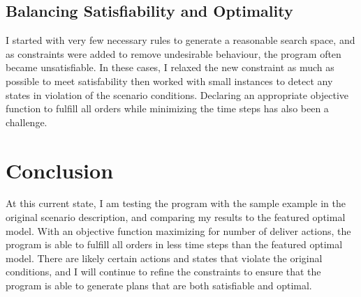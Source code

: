 \documentclass[letterpaper]{article}
\begin{document}
\subsection{Balancing Satisfiability and Optimality}

I started with very few necessary rules to generate a reasonable search space, and as constraints were added to remove undesirable behaviour, the program often became unsatisfiable. In these cases, I relaxed the new constraint as much as possible to meet satisfability then worked with small instances to detect any states in violation of the scenario conditions. Declaring an appropriate objective function to fulfill all orders while minimizing the time steps has also been a challenge.

\section{Conclusion}

At this current state, I am testing the program with the sample example in the original scenario description, and comparing my results to the featured optimal model. With an objective function maximizing for number of deliver actions, the program is able to fulfill all orders in less time steps than the featured optimal model. There are likely certain actions and states that violate the original conditions, and I will continue to refine the constraints to ensure that the program is able to generate plans that are both satisfiable and optimal.

\nocite{erdem2021asp}
\nocite{DBLP:journals/aim/KaufmannLPS16}

\begin{quote}
    \begin{small}
        
        
    \end{small}
\end{quote}
\end{document}

